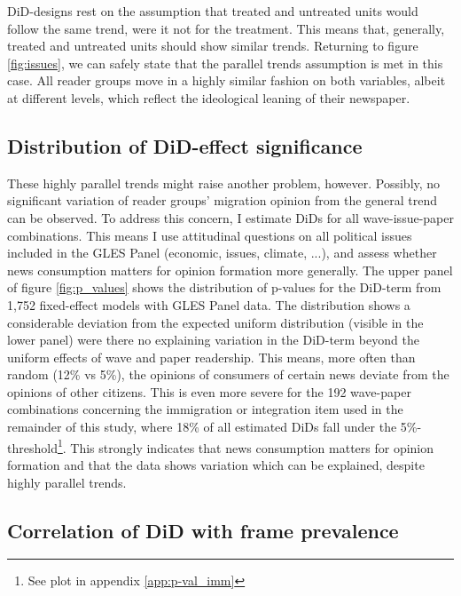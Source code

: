 \documentclass{article}
\begin{document}
DiD-designs rest on the assumption that treated and untreated units would follow the same trend, were it not for the treatment. This means that, generally, treated and untreated units should show similar trends. Returning to figure \ref{fig:issues}, we can safely state that the parallel trends assumption is met in this case. All reader groups move in a highly similar fashion on both variables, albeit at different levels, which reflect the ideological leaning of their newspaper.

\subsection{Distribution of DiD-effect significance}

These highly parallel trends might raise another problem, however. Possibly, no significant variation of reader groups' migration opinion from the general trend can be observed. To address this concern, I estimate DiDs for all wave-issue-paper combinations. This means I use attitudinal questions on all political issues included in the GLES Panel (economic, issues, climate, ...), and assess whether news consumption matters for opinion formation more generally. The upper panel of figure \ref{fig:p_values} shows the distribution of p-values for the DiD-term from 1,752 fixed-effect models with GLES Panel data. The distribution shows a considerable deviation from the expected uniform distribution (visible in the lower panel) were there no explaining variation in the DiD-term beyond the uniform effects of wave and paper readership. This means, more often than random (12\% vs 5\%), the opinions of consumers of certain news deviate from the opinions of other citizens. This is even more severe for the 192 wave-paper combinations concerning the immigration or integration item used in the remainder of this study, where 18\% of all estimated DiDs fall under the 5\%-threshold\footnote{See plot in appendix \ref{app:p-val_imm}}.  This strongly indicates that news consumption matters for opinion formation and that the data shows variation which can be explained, despite highly parallel trends.




\subsection{Correlation of DiD with frame prevalence}
\end{document}
